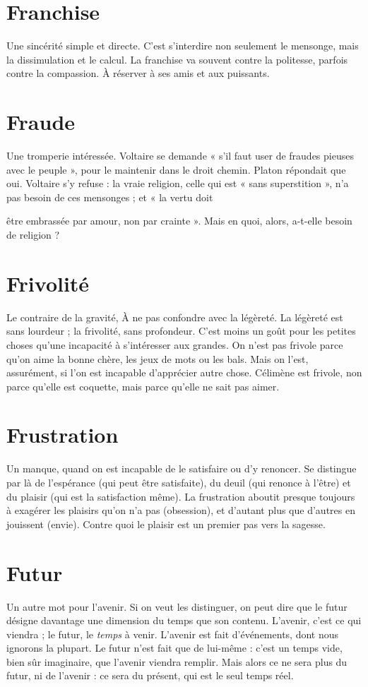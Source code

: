 \section{Franchise}
Une sincérité simple et directe. C’est s’interdire non seulement
le mensonge, mais la dissimulation et le calcul. La franchise
va souvent contre la politesse, parfois contre la compassion. À réserver à
ses amis et aux puissants.

\section{Fraude}
Une tromperie intéressée. Voltaire se demande « s’il faut user de
fraudes pieuses avec le peuple », pour le maintenir dans le droit
chemin. Platon répondait que oui. Voltaire s’y refuse : la vraie religion, celle
qui est « sans superstition », n’a pas besoin de ces mensonges ; et « la vertu doit

être embrassée par amour, non par crainte ». Mais en quoi, alors, a-t-elle besoin
de religion ?

\section{Frivolité}
Le contraire de la gravité, À ne pas confondre avec la légèreté.
La légèreté est sans lourdeur ; la frivolité, sans profondeur.
C’est moins un goût pour les petites choses qu’une incapacité à s'intéresser aux
grandes. On n’est pas frivole parce qu’on aime la bonne chère, les jeux de mots
ou les bals. Mais on l’est, assurément, si l’on est incapable d’apprécier autre
chose. Célimène est frivole, non parce qu’elle est coquette, mais parce qu’elle
ne sait pas aimer.

\section{Frustration}
Un manque, quand on est incapable de le satisfaire ou d’y
renoncer. Se distingue par là de l’espérance (qui peut être
satisfaite), du deuil (qui renonce à l'être) et du plaisir (qui est la satisfaction
même).
La frustration aboutit presque toujours à exagérer les plaisirs qu’on n’a pas
(obsession), et d’autant plus que d’autres en jouissent (envie). Contre quoi le
plaisir est un premier pas vers la sagesse.

\section{Futur}
Un autre mot pour l'avenir. Si on veut les distinguer, on peut dire
que le futur désigne davantage une dimension du temps que son
contenu. L'avenir, c’est ce qui viendra ; le futur, le {\it temps} à venir. L'avenir est
fait d'événements, dont nous ignorons la plupart. Le futur n’est fait que de lui-même :
c’est un temps vide, bien sûr imaginaire, que l’avenir viendra remplir.
Mais alors ce ne sera plus du futur, ni de l’avenir : ce sera du présent, qui est le
seul temps réel.


